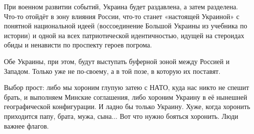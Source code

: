 При военном развитии событий, Украина будет раздавлена, а затем разделена.
Что-то отойдёт в зону влияния России, что-то станет «настоящей Украиной» с
понятной национальной идеей (воссоединение Большой Украины из учебника по
истории) и одной на всех патриотической идентичностью, идущей на стероидах
обиды и ненависти по проспекту героев погрома. 

Обе Украины, при этом, будут выступать буферной зоной между Россией и Западом.
Только уже не по-своему, а в той позе, в которую их поставят.

Выбор прост: либо мы хороним глупую затею с НАТО, куда нас никто не спешит
брать, и выполняем Минские соглашения, либо хороним Украину в её нынешней
географической конфигурации. И ладно бы только Украину. Хуже, когда хоронить
приходится папу, брата, мужа, сына... Вот что нужно бояться хоронить. Люди
важнее флагов.

